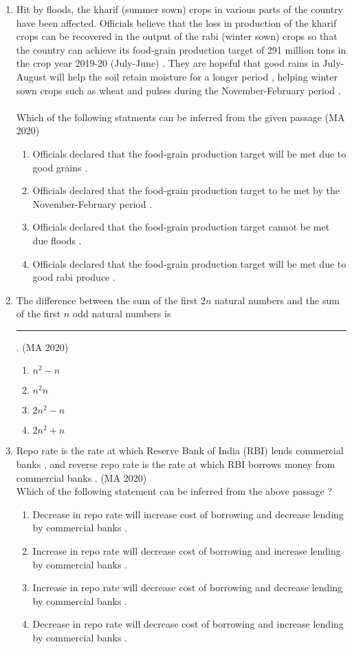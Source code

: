 \documentclass[journal,12pt,onecolumn]{IEEEtran}
\theoremstyle{remark}
\begin{document}
\begin{enumerate}
\item  	Hit by floods, the kharif (summer sown) crops in various parts of the country have been affected. Officials believe that the loss in production of the kharif crops can be recovered in the output of the rabi (winter sown) crops so that the country can achieve its food-grain production target of 291 million tons in the crop year 2019-20 (July-June) . They are hopeful that good rains in July-August will help the soil retain moisture for a longer period , helping winter sown crops such as wheat and pulses during the November-February period .
\\
\\
Which of the following statments can be inferred from the given passage
\hfill{(MA 2020)}
\begin{enumerate}
\item Officials declared that the food-grain production target will be met due to good grains .
\item Officials declared that the food-grain production target to be met by the November-February period .
\item Officials declared that the food-grain production target cannot be met due floods .
\item Officials declared that the food-grain production target will be met due to good rabi produce .
\end{enumerate}
 
 
 \item The difference between the sum of the first $2n$ natural numbers and the sum of the first $n$ odd natural numbers is \rule{2cm}{0.4pt} .
  \hfill{(MA 2020)}
 \begin{enumerate}
\item $n^2-n$
\item $n^2n$
\item $2n^2-n$
\item $2n^2+n$
\end{enumerate}


 \item Repo rate is the rate at which Reserve Bank of India (RBI) lends commercial banks , and reverse repo rate is the rate at which RBI borrows money from commercial banks .
 \hfill{(MA 2020)}
 \\ 
Which of the following statement can be inferred from the above passage ?

 \begin{enumerate}
\item Decrease in repo rate will increase cost of borrowing and decrease lending by commercial banks .
\item Increase in repo rate will decrease cost of borrowing and increase lending by commercial banks .
\item Increase in repo rate will decrease cost of borrowing and decrease lending by commercial banks .
\item Decrease in repo rate will decrease cost of borrowing and increase lending by commercial banks .
\end{enumerate}


\end{enumerate}
\end{document}
